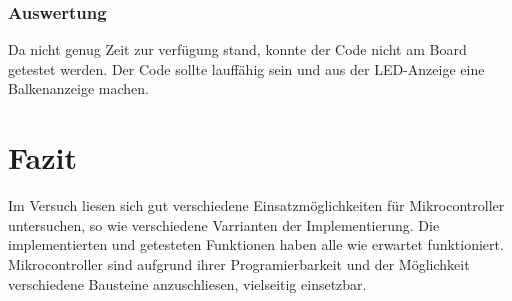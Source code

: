 \documentclass[12pt,a4paper]{article}
\begin{document}
\subsubsection*{Auswertung}

Da nicht genug Zeit zur verfügung stand, konnte der Code nicht am Board getestet werden. Der Code sollte lauffähig sein und aus der LED-Anzeige eine Balkenanzeige machen.

\section{Fazit}

Im Versuch liesen sich gut verschiedene Einsatzmöglichkeiten für Mikrocontroller untersuchen, so wie verschiedene Varrianten der Implementierung. Die implementierten und getesteten Funktionen haben alle wie erwartet funktioniert. Mikrocontroller sind aufgrund ihrer Programierbarkeit und der Möglichkeit verschiedene Bausteine anzuschliesen, vielseitig einsetzbar.
\end{document}
